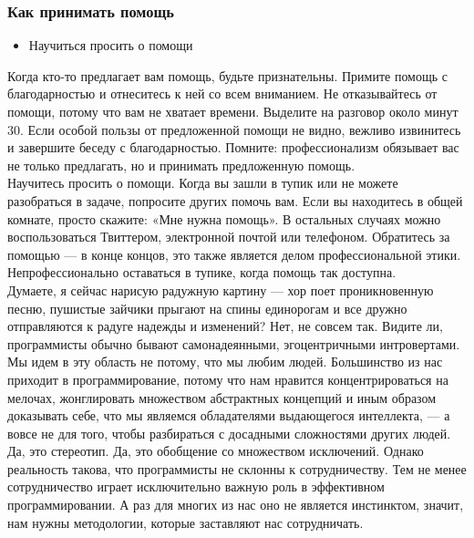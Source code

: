 \documentclass{../industrial-development}
\begin{document}
\begin{frame} \frametitle{Как принимать помощь}
\begin{itemize}
  \item Научиться просить о помощи
\end{itemize}
\end{frame}
\lecturenotes
Когда кто-то предлагает вам помощь, будьте признательны. Примите помощь с благодарностью и отнеситесь к ней со всем вниманием. Не отказывайтесь от помощи, потому что вам не хватает времени. Выделите на разговор около минут 30. Если особой пользы от предложенной помощи не видно, вежливо извинитесь и завершите беседу с благодарностью. Помните: профессионализм обязывает вас не только предлагать, но и принимать предложенную помощь.\\
Научитесь просить о помощи. Когда вы зашли в тупик или не можете разобраться в задаче, попросите других помочь вам. Если вы находитесь в общей комнате, просто скажите: «Мне нужна помощь». В остальных случаях можно воспользоваться Твиттером, электронной почтой или телефоном. Обратитесь за помощью — в конце концов, это также является делом профессиональной этики. Непрофессионально оставаться в тупике, когда помощь так доступна.\\
Думаете, я сейчас нарисую радужную картину — хор поет проникновенную песню, пушистые зайчики прыгают на спины единорогам и все дружно отправляются к радуге надежды и изменений? Нет, не совсем так. Видите ли, программисты обычно бывают самонадеянными, эгоцентричными интровертами. Мы идем в эту область не потому, что мы любим людей. Большинство из нас приходит в программирование, потому что нам нравится концентрироваться на мелочах, жонглировать множеством абстрактных концепций и иным образом доказывать себе, что мы являемся обладателями выдающегося интеллекта, — а вовсе не для того, чтобы разбираться с досадными сложностями других людей.\\
Да, это стереотип. Да, это обобщение со множеством исключений. Однако реальность такова, что программисты не склонны к сотрудничеству. Тем не менее сотрудничество играет исключительно важную
роль в эффективном программировании. А раз для многих из нас оно не является инстинктом, значит, нам нужны методологии, которые заставляют нас сотрудничать.
\end{document}
